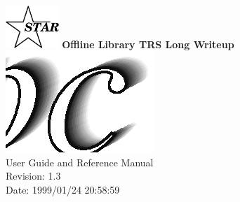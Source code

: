 \documentclass[twoside]{article}
\begin{document}
%
%
\begin{titlepage}
\pagestyle{empty}
\vspace*{-35mm}
\begin{center}
  \mbox{\includegraphics[width=2cm]{StarIcon.eps}}
  {\Large\bf Offline Library TRS Long Writeup}
  \hfill\mbox{}\\[3cm]
  \mbox{\includegraphics[width=\textwidth]{trsTitle.eps}}
  \hfill\mbox{}\\[3cm]
  {\LARGE User Guide and Reference Manual}\\[2cm]
  {\LARGE $ $Revision: 1.3 $ $}  \\[5mm] %
  {\LARGE $ $Date: 1999/01/24 20:58:59 $ $}  %
  \vfill
\end{center}
\cleardoublepage
\end{titlepage}

%
%
\tableofcontents
\cleardoublepage

%
%
\end{document}
